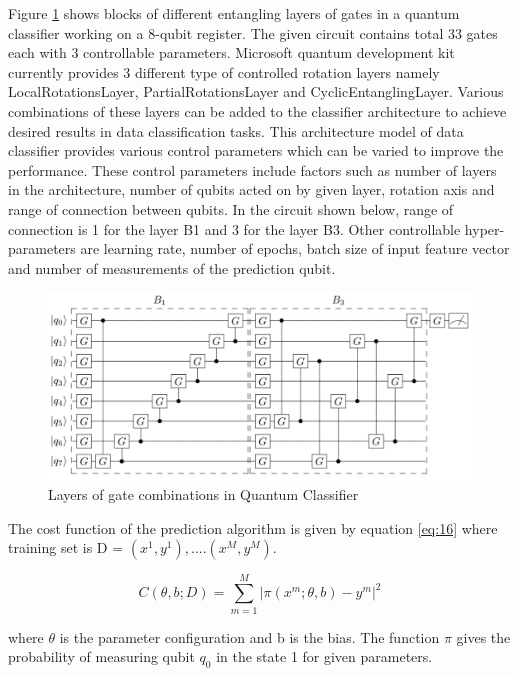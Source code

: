 \documentclass[english,a4paper,11pt,oneside,onecolumn]{book}
\begin{document}
Figure \ref{fig:gateBlocks} shows blocks of different entangling layers of gates in a quantum classifier working on a 8-qubit register. The given circuit contains total 33 gates each with 3 controllable parameters. Microsoft quantum development kit currently provides 3 different type of controlled rotation layers namely LocalRotationsLayer, PartialRotationsLayer and CyclicEntanglingLayer. Various combinations of these layers can be added to the classifier architecture to achieve desired results in data classification tasks. This architecture model of data classifier provides various control parameters which can be varied to improve the performance. These control parameters include factors such as number of layers in the architecture, number of qubits acted on by given layer, rotation axis and range of connection between qubits. In the circuit shown below, range of connection is 1 for the layer B1 and 3 for the layer B3.  Other controllable hyper-parameters are learning rate, number of epochs, batch size of input feature vector and number of measurements of the prediction qubit.

\begin{figure}[H]
    \centering
    \includegraphics[scale=0.7]{Images/GradientGateBlocks.PNG}
    \caption{Layers of gate combinations in Quantum Classifier \cite{schuld_2020_circuitcentric}}
    \label{fig:gateBlocks}
\end{figure}

The cost function of the prediction algorithm is given by equation \ref{eq:16} where training set is D = ${(x^1, y^1),....(x^M, y^M)}$.

\begin{equation}\label{eq:16}
C(\theta, b; D) = \sum_{m=1}^{M} |\pi(x^m; \theta, b) - y^m|^2
\end{equation}

where \(\theta\) is the parameter configuration and b is the bias. The function $\pi$ gives the probability of measuring qubit \(q_0\) in the state 1 for given parameters.
\end{document}
